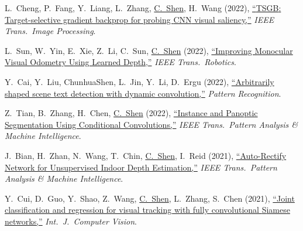 \documentclass[9pt, a4paper]{article}
\newcommand{\years}[1]{\marginnote{\scriptsize #1}}
\def\highlight{\uline}
\begin{document}
\medskip

\years{2022} L.~Cheng, P.~Fang, Y.~Liang, L.~Zhang, \highlight{C.~Shen}, H.~Wang (2022),
\href{http://www.google.com/search?lr=&ie=UTF-8&oe=UTF-8&q=TSGB%3A+Target-selective+gradient+backprop+for+probing+CNN+visual+saliency+Lin+Cheng%2C+Pengfei+Fang%2C+Yanjie+Liang%2C+Liao+Zhang%2C+Chunhua+Shen%2C+Hanzi+Wang}{``{TSGB}: Target-selective gradient backprop for probing {CNN} visual saliency,{}''}
\emph{IEEE Trans.\  Image Processing}.

\medskip

\years{2022} L.~Sun, W.~Yin, E.~Xie, Z.~Li, C.~Sun, \highlight{C.~Shen} (2022),
\href{http://www.google.com/search?lr=&ie=UTF-8&oe=UTF-8&q=Improving+Monocular+Visual+Odometry+Using+Learned+Depth+Libo+Sun%2C+Wei+Yin%2C+Enze+Xie%2C+Zhengrong+Li%2C+Changming+Sun%2C+Chunhua+Shen}{``Improving Monocular Visual Odometry Using Learned Depth,{}''}
\emph{IEEE Trans.\  Robotics}.

\medskip

\years{2022} Y.~Cai, Y.~Liu, ChunhuaShen, L.~Jin, Y.~Li, D.~Ergu (2022),
\href{http://www.google.com/search?lr=&ie=UTF-8&oe=UTF-8&q=Arbitrarily+shaped+scene+text+detection+with+dynamic+convolution+Ying+Cai%2C+Yuliang+Liu%2C+ChunhuaShen%2C+Lianwen+Jin%2C+Yidong+Li%2C+Daji+Ergu}{``Arbitrarily shaped scene text detection with dynamic convolution,{}''}
\emph{Pattern Recognition}.

\medskip

\years{2022} Z.~Tian, B.~Zhang, H.~Chen, \highlight{C.~Shen} (2022),
\href{http://www.google.com/search?lr=&ie=UTF-8&oe=UTF-8&q=Instance+and+Panoptic+Segmentation+Using+Conditional+Convolutions+Zhi+Tian%2C+Bowen+Zhang%2C+Hao+Chen%2C+Chunhua+Shen}{``Instance and Panoptic Segmentation Using Conditional Convolutions,{}''}
\emph{IEEE Trans.\  Pattern Analysis \& Machine Intelligence}.

\medskip

\years{2021} J.~Bian, H.~Zhan, N.~Wang, T.~Chin, \highlight{C.~Shen}, I.~Reid (2021),
\href{http://www.google.com/search?lr=&ie=UTF-8&oe=UTF-8&q=Auto-Rectify+Network+for+Unsupervised+Indoor+Depth+Estimation+Jia-Wang+Bian%2C+Huangying+Zhan%2C+Naiyan+Wang%2C+Tat-Jun+Chin%2C+Chunhua+Shen%2C+Ian+Reid}{``Auto-Rectify Network for Unsupervised Indoor Depth Estimation,{}''}
\emph{IEEE Trans.\  Pattern Analysis \& Machine Intelligence}.

\medskip

\years{2021} Y.~Cui, D.~Guo, Y.~Shao, Z.~Wang, \highlight{C.~Shen}, L.~Zhang, S.~Chen (2021),
\href{http://www.google.com/search?lr=&ie=UTF-8&oe=UTF-8&q=Joint+classification+and+regression+for+visual+tracking+with+fully+convolutional+Siamese+networks+Ying+Cui%2C+Dongyan+Guo%2C+Yanyan+Shao%2C+Zhenhua+Wang%2C+Chunhua+Shen%2C+Liyan+Zhang%2C+Shengyong+Chen}{``Joint classification and regression for visual tracking with fully convolutional {S}iamese networks,{}''}
\emph{Int.\ J.\  Computer Vision}.
\end{document}
